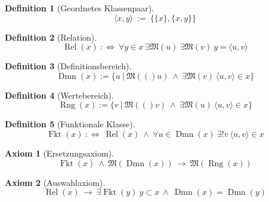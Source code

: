 \documentclass[a4paper,german,10pt,twoside]{book}
\newtheorem{ax}{Axiom}
\newtheorem{defn}{Definition}
\newcommand{\deft}{:=}
\newcommand{\defp}{\ :\Leftrightarrow \ }
\newcommand{\impl}{\ \rightarrow \ }
\newcommand{\conj}{\ \wedge \ }
\newcommand{\isSet}[1]{\mathfrak{M}(#1)}
\DeclareMathOperator{\rel}{Rel} \DeclareMathOperator{\fkt}{Fkt} \DeclareMathOperator{\dmn}{Dmn}
\DeclareMathOperator{\rng}{Rng}
\begin{document}
{\begin{defn}[Geordnetes Klassenpaar]
$$
\langle x, y\rangle \ \deft \ \{\{x\}, \{x, y\}\}
$$
\end{defn}

\begin{defn}[Relation]
$$\rel(x) \defp \forall y \in x \ \exists \isSet{u} \ \exists \isSet{v} \ y = \langle u, v\rangle$$
\end{defn}

\begin{defn}[Definitionsbereich]
$$\dmn(x) \deft \{u~|~\isSet(u) \conj \exists \isSet{v} \ \langle u, v\rangle \in x\}$$
\end{defn}

\begin{defn}[Wertebereich]
$$\rng(x) \deft \{v~|~\isSet(v) \conj \exists \isSet{u} \ \langle u, v\rangle \in x\}$$
\end{defn}

\begin{defn}[Funktionale Klasse]
$$\fkt(x) \defp \rel(x) \conj \forall u \in \dmn(x) \ \exists! v \ \langle u, v\rangle \in x$$
\end{defn}

\begin{ax}[Ersetzungsaxiom]
$$\fkt(x) \conj \isSet{\dmn(x)} \impl \isSet{\rng(x)}$$
\end{ax}

\begin{ax}[Auswahlaxiom]
$$\rel(x) \impl \exists \fkt(y) \ y \subset x \conj \dmn(x) = \dmn(y) $$
\end{ax}


}
\end{document}

